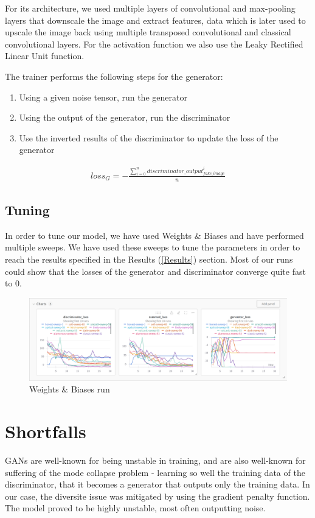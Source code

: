 \documentclass[conference]{IEEEtran}
\begin{document}
    For its architecture, we used multiple layers of convolutional and max-pooling layers that downscale the image and extract features,
data which is later used to upscale the image back using multiple transposed convolutional and classical convolutional layers.
For the activation function we also use the Leaky Rectified Linear Unit function.

    The trainer performs the following steps for the generator:
\begin{enumerate}
    \item Using a given noise tensor, run the generator
    \item Using the output of the generator, run the discriminator
    \item Use the inverted results of the discriminator to update the loss of the generator
\end{enumerate}

\begin{multline}
    loss_{G} = - \frac{\sum_{i=0}^{n} discriminator\_output_{fake\_image}^i}{n}
\end{multline}

\subsection{Tuning}
    In order to tune our model, we have used Weights \& Biases and have performed multiple sweeps. We have used these sweeps
to tune the parameters in order to reach the results specified in the Results (\ref{Results}) section. Most of our runs
could show that the losses of the generator and discriminator converge quite fast to 0.

\begin{figure}[!h]
    \centering
    \includegraphics[scale=0.15]{images/wandb.png}
    \caption{Weights \& Biases run} \label{WandB run}
\end{figure}

\section{Shortfalls}
    GANs are well-known for being unstable in training, and are also well-known for suffering of the mode collapse problem -
learning so well the training data of the discriminator, that it becomes a generator that outputs only the training data. In
our case, the diversite issue was mitigated by using the gradient penalty function. The model proved to be highly unstable,
most often outputting noise.
\end{document}
